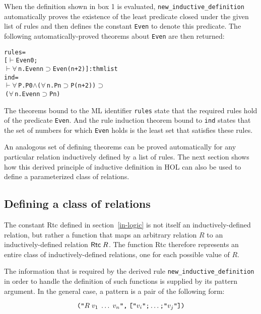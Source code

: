\documentclass[twocolumn,fleqn,layout]{article}
\begin{document}
When the definition shown in box 1 is evaluated,
\verb!new_inductive_definition! automatically proves the existence of the least
predicate closed under the given list of rules and then defines the constant
\verb!Even! to denote this predicate.  The following automatically-proved
theorems about \verb!Even! are then returned:

\begin{session}\begin{alltt}
rules =
[\(\vdash\) Even 0;
 \(\vdash\) \(\forall\,\)n. Even n \(\supset\) Even(n + 2)] : thm list
ind =
\(\vdash\) \(\forall\,\)P. P 0 \(\wedge\) (\(\forall\,\)n. P n \(\supset\) P(n + 2)) \(\supset\)
      \(\,\)(\(\forall\,\)n. Even n \(\supset\) P n)
\end{alltt}\end{session}


\noindent The theorems bound to the {\small ML} identifier \verb!rules! state
that the required rules hold of the predicate \verb!Even!. And the rule
induction theorem bound to \verb!ind! states that the set of numbers for which
\verb!Even! holds is the least set that satisfies these rules.

An analogous set of defining theorems can be proved automatically for any
particular relation inductively defined by a list of rules.  The next section
shows how this derived principle of inductive definition in {\small HOL} can
also be used to define a parameterized class of relations.

\subsection{Defining a class of relations}

The constant {\sf Rtc} defined in section~\ref{in-logic} is not itself an
inductively-defined relation, but rather a function that maps an arbitrary
relation $R$ to an inductively-defined relation ${\sf Rtc}\;R$.  The function
{\sf Rtc} therefore represents an entire class of inductively-defined
relations, one for each possible value of $R$.

The information that is required by the derived rule
\verb!new_inductive_definition! in order to handle the definition of such
functions is supplied by its pattern argument.  In the general case, a pattern
is a pair of the following form:

\[\hbox{\verb!("!}R\;v_1\;\dots\;v_n\hbox{\verb!",!}\;
 \hbox{\verb!["!}v_i\hbox{\verb!";!}\dots\hbox{\verb!;"!}v_j\hbox{\verb!"])!}
\]
\end{document}

